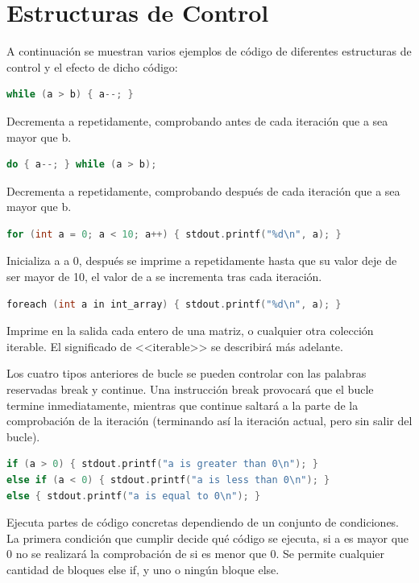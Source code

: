 \documentclass[12pt,twoside]{book}
\begin{document}
\section{Estructuras de Control}

A continuación se muestran varios ejemplos de código de diferentes estructuras de control y el efecto de dicho código:

\begin{lstlisting}[language=C++]
while (a > b) { a--; }
\end{lstlisting}

Decrementa a repetidamente, comprobando antes de cada iteración que a sea mayor que b.

\begin{lstlisting}[language=C++]
do { a--; } while (a > b);
\end{lstlisting}

Decrementa a repetidamente, comprobando después de cada iteración que a sea mayor que b.

\begin{lstlisting}[language=C++]
for (int a = 0; a < 10; a++) { stdout.printf("%d\n", a); }
\end{lstlisting}


Inicializa a a 0, después se imprime a repetidamente hasta que su valor deje de ser mayor de 10, el valor de a se incrementa tras cada iteración.

\begin{lstlisting}[language=C++]
foreach (int a in int_array) { stdout.printf("%d\n", a); }
\end{lstlisting}


Imprime en la salida cada entero de una matriz, o cualquier otra colección iterable. El significado de <<iterable>> se describirá más adelante.

Los cuatro tipos anteriores de bucle se pueden controlar con las palabras reservadas break y continue. Una instrucción break provocará que el bucle termine inmediatamente, mientras que continue saltará a la parte de la comprobación de la iteración (terminando así la iteración actual, pero sin salir del bucle).

\begin{lstlisting}[language=C++]
if (a > 0) { stdout.printf("a is greater than 0\n"); }
else if (a < 0) { stdout.printf("a is less than 0\n"); }
else { stdout.printf("a is equal to 0\n"); }
\end{lstlisting}

Ejecuta partes de código concretas dependiendo de un conjunto de condiciones. La primera condición que cumplir decide qué código se ejecuta, si a es mayor que 0 no se realizará la comprobación de si es menor que 0. Se permite cualquier cantidad de bloques else if, y uno o ningún bloque else.
\end{document}
